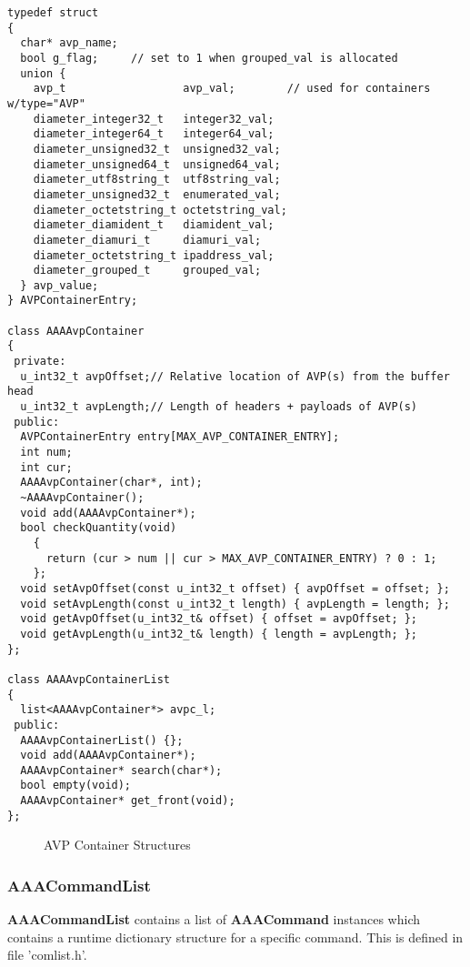 \begin{verbatim}
typedef struct
{
  char* avp_name;
  bool g_flag;     // set to 1 when grouped_val is allocated
  union {
    avp_t                  avp_val;        // used for containers w/type="AVP" 
    diameter_integer32_t   integer32_val;
    diameter_integer64_t   integer64_val;
    diameter_unsigned32_t  unsigned32_val;
    diameter_unsigned64_t  unsigned64_val;
    diameter_utf8string_t  utf8string_val;
    diameter_unsigned32_t  enumerated_val;
    diameter_octetstring_t octetstring_val;
    diameter_diamident_t   diamident_val;
    diameter_diamuri_t     diamuri_val;
    diameter_octetstring_t ipaddress_val;
    diameter_grouped_t     grouped_val;
  } avp_value;
} AVPContainerEntry;

class AAAAvpContainer
{
 private:
  u_int32_t avpOffset;// Relative location of AVP(s) from the buffer head 
  u_int32_t avpLength;// Length of headers + payloads of AVP(s)
 public:
  AVPContainerEntry entry[MAX_AVP_CONTAINER_ENTRY];
  int num;
  int cur;
  AAAAvpContainer(char*, int);
  ~AAAAvpContainer();
  void add(AAAAvpContainer*);
  bool checkQuantity(void) 
    {
      return (cur > num || cur > MAX_AVP_CONTAINER_ENTRY) ? 0 : 1;
    };
  void setAvpOffset(const u_int32_t offset) { avpOffset = offset; };
  void setAvpLength(const u_int32_t length) { avpLength = length; };
  void getAvpOffset(u_int32_t& offset) { offset = avpOffset; };
  void getAvpLength(u_int32_t& length) { length = avpLength; };
};

class AAAAvpContainerList
{
  list<AAAAvpContainer*> avpc_l;
 public:
  AAAAvpContainerList() {};
  void add(AAAAvpContainer*);
  AAAAvpContainer* search(char*);
  bool empty(void);
  AAAAvpContainer* get_front(void);
};
\end{verbatim}
\clearpage

\begin{figure}[htbp]
\begin{center}
\mbox{\epsfxsize=7in}
\caption{AVP Container Structures\label{fig:avp-container-struct}}
\end{center} 
\end{figure}
\clearpage

\subsubsection{AAACommandList}

{\bf AAACommandList} contains a list of {\bf AAACommand}
instances which contains a runtime dictionary structure for a 
specific command.  This is defined in file 'comlist.h'.


